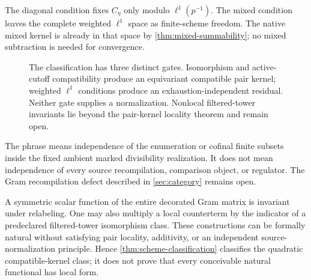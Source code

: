 The diagonal condition fixes $C_\eta$ only modulo
$\ell^1(p^{-1})$.  The mixed condition leaves the complete weighted
$\ell^1$ space as finite-scheme freedom.  The native mixed kernel is already
in that space by \cref{thm:mixed-summability}; no mixed subtraction is needed
for convergence.

\begin{figure}[t]
\centering

\caption{The classification has three distinct gates.  Isomorphism and
active-cutoff compatibility produce an equivariant compatible pair kernel;
weighted $\ell^1$ conditions produce an exhaustion-independent residual.
Neither gate supplies a normalization.  Nonlocal filtered-tower invariants
lie beyond the pair-kernel locality theorem and remain open.}
\label{fig:naturality-boundary}
\end{figure}

\begin{remark}
The phrase means independence of the enumeration or cofinal finite subsets
inside the fixed ambient marked divisibility realization.  It does not mean
independence of every source recompilation, comparison object, or regulator.
The Gram recompilation defect described in \cref{sec:category} remains open.
\end{remark}

\begin{remark}
A symmetric scalar function of the entire decorated Gram matrix is invariant
under relabeling.  One may also multiply a local counterterm by the indicator
of a predeclared filtered-tower isomorphism class.  These constructions can be
formally natural without satisfying pair locality, additivity, or an
independent source-normalization principle.  Hence
\cref{thm:scheme-classification} classifies the quadratic compatible-kernel
class; it does not prove that every conceivable natural functional has local
form.
\end{remark}
